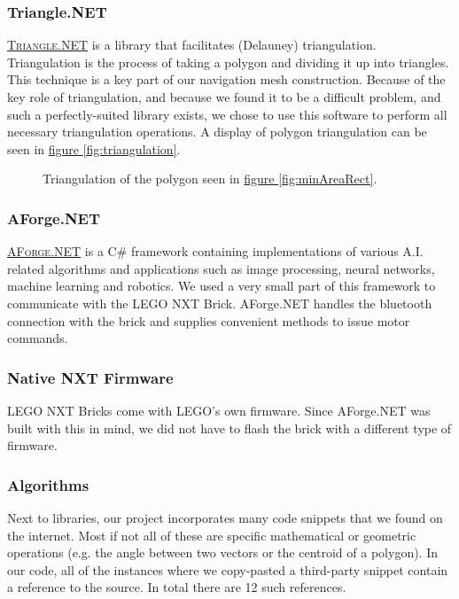\documentclass[10pt, abstracton, twocolumn]{scrartcl}
\newcommand{\fref}[1]{\hyperref[#1]{figure \vref{#1}}}
\newcommand{\link}[2]{\textsc{\href{#1}{#2}}}
\begin{document}
\subsubsection{Triangle.NET}
\link{http://triangle.codeplex.com/}{Triangle.NET} is a library that facilitates (Delauney) triangulation. Triangulation is the process of taking a polygon and dividing it up into triangles. This technique is a key part of our navigation mesh construction. Because of the key role of triangulation, and because we found it to be a difficult problem, and such a perfectly-suited library exists, we chose to use this software to perform all necessary triangulation operations. A display of polygon triangulation can be seen in \fref{fig:triangulation}.

\begin{figure}[h]
        \centering
        
        \caption{\small Triangulation of the polygon seen in \fref{fig:minAreaRect}.}
        \label{fig:triangulation}
\end{figure}

\subsubsection{AForge.NET}
\link{http://www.aforgenet.com}{AForge.NET} is a C\# framework containing implementations of various A.I. related algorithms and applications such as image processing, neural networks, machine learning and robotics. We used a very small part of this framework to communicate with the LEGO NXT Brick. AForge.NET handles the bluetooth connection with the brick and supplies convenient methods to issue motor commands.

\subsubsection{Native NXT Firmware}
LEGO NXT Bricks come with LEGO's own firmware. Since AForge.NET was built with this in mind, we did not have to flash the brick with a different type of firmware.

\subsubsection{Algorithms}
Next to libraries, our project incorporates many code snippets that we found on the internet. Most if not all of these are specific mathematical or geometric operations (e.g. the angle between two vectors or the centroid of a polygon). In our code, all of the instances where we copy-pasted a third-party snippet contain a reference to the source. In total there are 12 such references.
\end{document}

